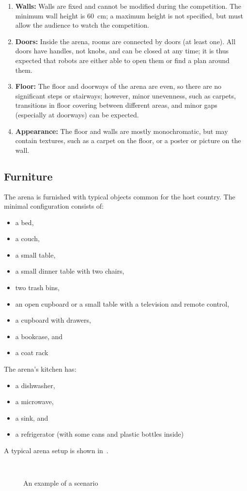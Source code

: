 \begin{enumerate}
	\item \textbf{Walls:} Walls are fixed and cannot be modified during the competition. The minimum wall height is \SI{60}{\centi\meter}; a maximum height is not specified, but must allow the audience to watch the competition.
	\item \textbf{Doors:} Inside the arena, rooms are connected by doors (at least one). All doors have handles, not knobs, and can be closed at any time; it is thus expected that robots are either able to open them or find a plan around them.
	\item \textbf{Floor:} The floor and doorways of the arena are even, so there are no significant steps or stairways; however, minor unevenness, such as carpets, transitions in floor covering between different areas, and minor gaps (especially at doorways) can be expected.
	\item \textbf{Appearance:} The floor and walls are mostly monochromatic, but may contain textures, such as a carpet on the floor, or a poster or picture on the wall.
\end{enumerate}


\subsection{Furniture}
\label{rule:scenario_furniture}

The arena is furnished with typical objects common for the host country.
The minimal configuration consists of:
\begin{itemize}
	\item a bed,
	\item a couch,
	\item a small table,
	\item a small dinner table with two chairs,
	\item two trash bins,
	\item an open cupboard or a small table with a television and remote control,
	\item a cupboard with drawers,
	\item a bookcase, and
	\item a coat rack
\end{itemize}
The arena's kitchen has:
\begin{itemize}
	\item a dishwasher,
	\item a microwave,
	\item a sink, and
	\item a refrigerator (with some cans and plastic bottles inside)
\end{itemize}
A typical arena setup is shown in~.
\begin{figure}[tbp]
	\centering
	 ~
	\caption{An example of a \RoboCup\AtHome scenario}
	\label{fig:arena}
\end{figure}

